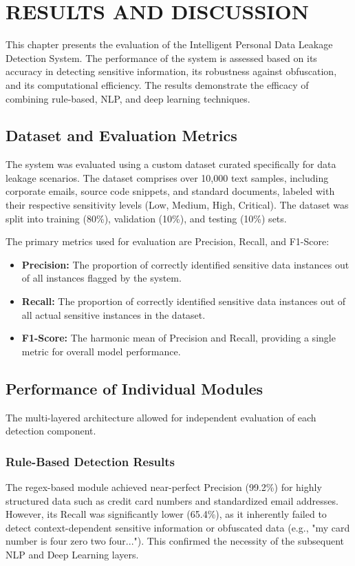 \chapter{RESULTS AND DISCUSSION}
\thispagestyle{fancy}
\hspace{0.5cm}
This chapter presents the evaluation of the Intelligent Personal Data Leakage Detection System. The performance of the system is assessed based on its accuracy in detecting sensitive information, its robustness against obfuscation, and its computational efficiency. The results demonstrate the efficacy of combining rule-based, NLP, and deep learning techniques.

\section{Dataset and Evaluation Metrics}
\par The system was evaluated using a custom dataset curated specifically for data leakage scenarios. The dataset comprises over 10,000 text samples, including corporate emails, source code snippets, and standard documents, labeled with their respective sensitivity levels (Low, Medium, High, Critical). The dataset was split into training (80\%), validation (10\%), and testing (10\%) sets.

\par The primary metrics used for evaluation are Precision, Recall, and F1-Score:
\begin{itemize}
    \item \textbf{Precision:} The proportion of correctly identified sensitive data instances out of all instances flagged by the system.
    \item \textbf{Recall:} The proportion of correctly identified sensitive data instances out of all actual sensitive instances in the dataset.
    \item \textbf{F1-Score:} The harmonic mean of Precision and Recall, providing a single metric for overall model performance.
\end{itemize}

\section{Performance of Individual Modules}
\par The multi-layered architecture allowed for independent evaluation of each detection component.

\subsection{Rule-Based Detection Results}
\par The regex-based module achieved near-perfect Precision (99.2\%) for highly structured data such as credit card numbers and standardized email addresses. However, its Recall was significantly lower (65.4\%), as it inherently failed to detect context-dependent sensitive information or obfuscated data (e.g., "my card number is four zero two four..."). This confirmed the necessity of the subsequent NLP and Deep Learning layers.

